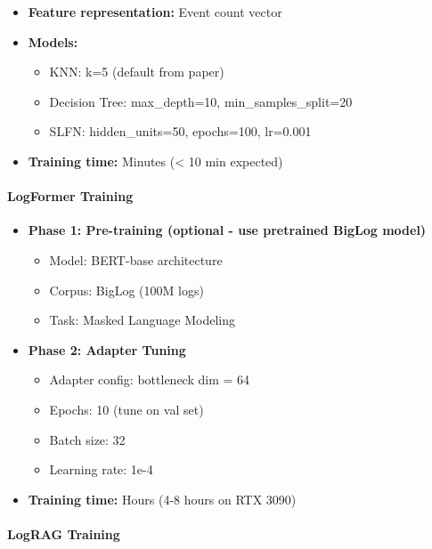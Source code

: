 \begin{itemize}
    \item \textbf{Feature representation:} Event count vector
    \item \textbf{Models:}
        \begin{itemize}
            \item KNN: k=5 (default from paper)
            \item Decision Tree: max\_depth=10, min\_samples\_split=20
            \item SLFN: hidden\_units=50, epochs=100, lr=0.001
        \end{itemize}
    \item \textbf{Training time:} Minutes (< 10 min expected)
\end{itemize}

\paragraph{LogFormer Training}

\begin{itemize}
    \item \textbf{Phase 1: Pre-training (optional - use pretrained BigLog model)}
        \begin{itemize}
            \item Model: BERT-base architecture
            \item Corpus: BigLog (100M logs)
            \item Task: Masked Language Modeling
        \end{itemize}
    \item \textbf{Phase 2: Adapter Tuning}
        \begin{itemize}
            \item Adapter config: bottleneck dim = 64
            \item Epochs: 10 (tune on val set)
            \item Batch size: 32
            \item Learning rate: 1e-4
        \end{itemize}
    \item \textbf{Training time:} Hours (4-8 hours on RTX 3090)
\end{itemize}

\paragraph{LogRAG Training}


